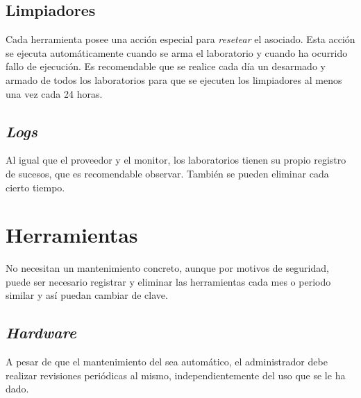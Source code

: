 \subsection*{Limpiadores}
Cada herramienta posee una acción especial para \emph{resetear} el 
\hardware asociado. Esta acción se ejecuta automáticamente cuando se 
arma el laboratorio y cuando ha ocurrido fallo de ejecución. Es 
recomendable que se realice cada día un desarmado y armado de todos 
los laboratorios para que se ejecuten los limpiadores al menos una vez 
cada 24 horas.

\subsection*{\emph{Logs}}
Al igual que el proveedor y el monitor, los laboratorios tienen su 
propio registro de sucesos, que es recomendable observar. También 
se pueden eliminar cada cierto tiempo.

\section*{Herramientas}
No necesitan un mantenimiento concreto, aunque por motivos de 
seguridad, puede ser necesario registrar y eliminar las herramientas 
cada mes o periodo similar y así puedan cambiar de clave.

\subsection*{\emph{Hardware}}
A pesar de que el mantenimiento del \hardware sea automático, el 
administrador debe realizar revisiones periódicas al mismo, 
independientemente del uso que se le ha dado.

